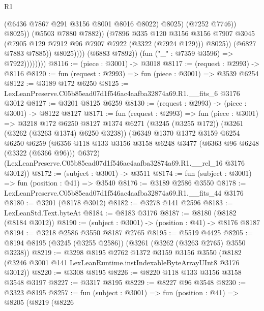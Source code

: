 \begin{lexlean}{R1}
\begin{coremodule}
                                          (@6436 @7867 @291 @3156 @8001 @8016 @8022)
                                          @8025)
                                        (@7252 @7746))
                                      @8025))
                                  (@5503 @7880 @7882))
                                (@7896
                                  @335
                                  @120
                                  @3156
                                  @3156
                                  @7907
                                  @3045
                                  (@7905 @129 @7912 @96 @7907 @7922 (@3322 (@7924 @129)))
                                  @8025))
                              (@6827 @7883 @7885))
                            @8025))))
                    (@6883 @7892))
                  (fun ("_" : @7359 @3596) => @7922))))))))
@8116 := (piece : @3001) -> @3018
@8117 := (request : @2993) -> @8116
@8120 := fun (request : @2993) => fun (piece : @3001) => @3539 @6254
@8122 := @3189 @172 @6250
@8125 := LexLeanPreserve.C05b85ead07d1f546ac4aafba32874a69.R1.__fits_6 @3176 @3012
@8127 := @3201 @8125 @6259
@8130 := (request : @2993) -> (piece : @3001) -> @8122 @8127
@8171 := fun (request : @2993) =>
  fun (piece : @3001) =>
  @3218
    @172
    @6250
    @8127
    @1374
    @6271
    (@3245 (@3255 @172))
    (@3261 (@3262 (@3263 @1374) @6250 @3238))
    (@6349
      @1370
      @1372
      @3159
      @6254
      @6250
      @6259
      (@6356 @118 @133 @3156 @3158 @6248 @3477 (@6363 @96 @6248 (@3322 (@6366 @96))) @6372)
      (LexLeanPreserve.C05b85ead07d1f546ac4aafba32874a69.R1.__rel_16 @3176 @3012))
@8172 := (subject : @3001) -> @3511
@8174 := fun (subject : @3001) => fun (position : @41) => @3540
@8176 := @3189 @2586 @3550
@8178 := LexLeanPreserve.C05b85ead07d1f546ac4aafba32874a69.R1.__fits_44 @3176
@8180 := @3201 (@8178 @3012)
@8182 := @3278 @141 @2596
@8183 := LexLeanStd.Text.byteAt
@8184 := @8183 @3176
@8187 := @8180 (@8182 (@8184 @3012))
@8190 := (subject : @3001) -> (position : @41) -> @8176 @8187
@8194 := @3218 @2586 @3550 @8187 @2765
@8195 := @5519 @4425
@8205 := @8194 @8195 (@3245 (@3255 @2586)) (@3261 (@3262 (@3263 @2765) @3550 @3238))
@8219 := @3298
    @8195
    @2762
    @1372
    @3159
    @3156
    @3550
    (@8182 (@3246 @3001 @141 LexLeanRuntime.instIndexableByteArrayUInt8 @3176 @3012))
@8220 := @3308 @8195
@8226 := @8220 @118 @133 @3156 @3158 @3548 @3197
@8227 := @3317 @8195
@8229 := @8227 @96 @3548
@8230 := @3323 @8195
@8257 := fun (subject : @3001) =>
  fun (position : @41) =>
  @8205
    (@8219
      (@8226

\end{coremodule}
\end{lexlean}
